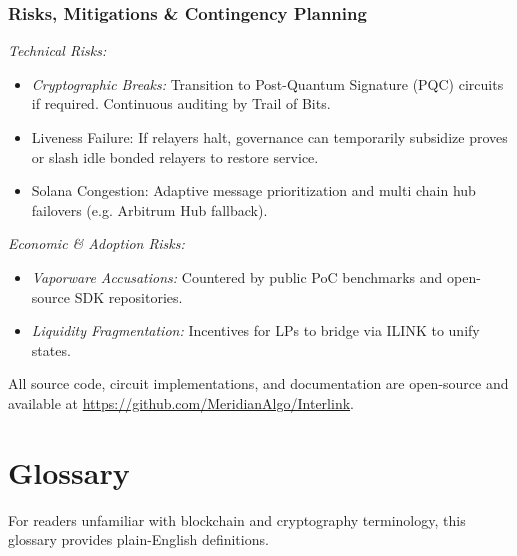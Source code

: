 \documentclass[11pt,a4paper]{article}
\begin{document}
\subsubsection{Risks, Mitigations \& Contingency Planning}

\textit{Technical Risks:}
\begin{itemize}
    \item \textit{Cryptographic Breaks:} Transition to Post-Quantum Signature (PQC) circuits if required. Continuous auditing by Trail of Bits.
    \item Liveness Failure: If relayers halt, governance can temporarily subsidize proves or slash idle bonded relayers to restore service.
    \item Solana Congestion: Adaptive message prioritization and multi chain hub failovers (e.g. Arbitrum Hub fallback).
\end{itemize}

\textit{Economic \& Adoption Risks:}
\begin{itemize}
    \item \textit{Vaporware Accusations:} Countered by public PoC benchmarks and open-source SDK repositories.
    \item \textit{Liquidity Fragmentation:} Incentives for LPs to bridge via ILINK to unify states.
\end{itemize}

All source code, circuit implementations, and documentation are open-source and available at \url{https://github.com/MeridianAlgo/Interlink}.

\newpage

\section*{Glossary}

For readers unfamiliar with blockchain and cryptography terminology, this glossary provides plain-English definitions.
\end{document}

